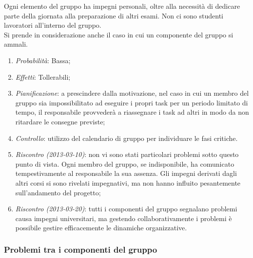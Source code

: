 Ogni elemento del gruppo ha impegni personali, oltre alla necessità di dedicare parte della giornata alla preparazione di altri esami. Non ci sono studenti lavoratori all'interno del gruppo. \\
Si prende in considerazione anche il caso in cui un componente del gruppo si ammali. 		
\begin{enumerate}
\item \textit{Probabilità}: Bassa;
\item \textit{Effetti}: Tollerabili;
\item \textit{Pianificazione}: a prescindere dalla motivazione, nel caso in cui un membro del gruppo sia impossibilitato ad eseguire i propri task per un periodo limitato di tempo, il responsabile provvederà a riassegnare i task ad altri in modo da non ritardare le consegne previste;
\item \textit{Controllo}: utilizzo del calendario di gruppo per individuare le fasi critiche.
\item \textit{Riscontro (2013-03-10)}: non vi sono stati particolari problemi sotto questo punto di vista. Ogni membro del gruppo, se indisponibile, ha comunicato tempestivamente al responsabile la sua assenza. Gli impegni derivati dagli altri corsi si sono rivelati impegnativi, ma non hanno influito pesantemente sull'andamento del progetto;
\item \textit{Riscontro (2013-03-20)}: tutti i componenti del gruppo segnalano problemi causa impegni universitari, ma gestendo collaborativamente i problemi è possibile gestire efficacemente le dinamiche organizzative.
\end{enumerate}

		\subsubsection{Problemi tra i componenti del gruppo}

